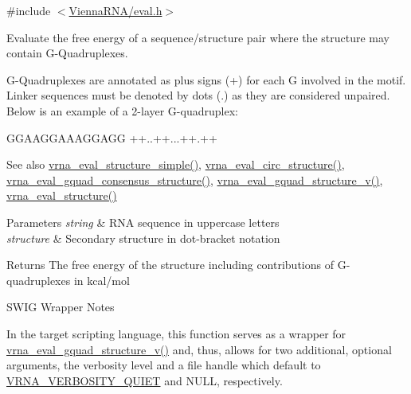 {\ttfamily \#include $<$\mbox{\hyperlink{eval_8h}{Vienna\+R\+N\+A/eval.\+h}}$>$}



Evaluate the free energy of a sequence/structure pair where the structure may contain G-\/\+Quadruplexes. 

G-\/\+Quadruplexes are annotated as plus signs (\textquotesingle{}+\textquotesingle{}) for each G involved in the motif. Linker sequences must be denoted by dots (\textquotesingle{}.\textquotesingle{}) as they are considered unpaired. Below is an example of a 2-\/layer G-\/quadruplex\+: 
\begin{DoxyCode}
GGAAGGAAAGGAGG
++..++...++.++
\end{DoxyCode}


\begin{DoxySeeAlso}{See also}
\mbox{\hyperlink{group__eval_ga7e5273464b775d4130245681312c1369}{vrna\+\_\+eval\+\_\+structure\+\_\+simple()}}, \mbox{\hyperlink{group__eval_ga3e05a23ddf9b083f4e69881e440d4866}{vrna\+\_\+eval\+\_\+circ\+\_\+structure()}}, \mbox{\hyperlink{group__eval_gaf09a326b3d57a4b30c27bd0e216198ac}{vrna\+\_\+eval\+\_\+gquad\+\_\+consensus\+\_\+structure()}}, \mbox{\hyperlink{group__eval_gaeaa2bdbc1b5d78c667e735fbdff87fff}{vrna\+\_\+eval\+\_\+gquad\+\_\+structure\+\_\+v()}}, \mbox{\hyperlink{group__eval_ga58f199f1438d794a265f3b27fc8ea631}{vrna\+\_\+eval\+\_\+structure()}}
\end{DoxySeeAlso}

\begin{DoxyParams}{Parameters}
{\em string} & R\+NA sequence in uppercase letters \\
\hline
{\em structure} & Secondary structure in dot-\/bracket notation \\
\hline
\end{DoxyParams}
\begin{DoxyReturn}{Returns}
The free energy of the structure including contributions of G-\/quadruplexes in kcal/mol
\end{DoxyReturn}
\begin{DoxyRefDesc}{S\+W\+I\+G Wrapper Notes}
\item[\mbox{\hyperlink{wrappers__wrappers000037}{S\+W\+I\+G Wrapper Notes}}]In the target scripting language, this function serves as a wrapper for \mbox{\hyperlink{group__eval_gaeaa2bdbc1b5d78c667e735fbdff87fff}{vrna\+\_\+eval\+\_\+gquad\+\_\+structure\+\_\+v()}} and, thus, allows for two additional, optional arguments, the verbosity level and a file handle which default to \mbox{\hyperlink{eval_8h_af4afe19780b61b4962c613bde324128b}{V\+R\+N\+A\+\_\+\+V\+E\+R\+B\+O\+S\+I\+T\+Y\+\_\+\+Q\+U\+I\+ET}} and N\+U\+LL, respectively. \end{DoxyRefDesc}
\mbox{\label{group__eval_ga9dba2fc5d7e6ad1359a7c2f350589c0e}} 
